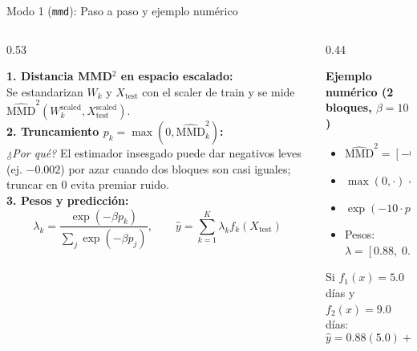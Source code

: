 \documentclass[aspectratio=169,11pt,table]{beamer}
\begin{document}
\begin{frame}{Modo 1 (\texttt{mmd}): Paso a paso y ejemplo numérico}
\setlength{\abovedisplayskip}{2pt}
\setlength{\belowdisplayskip}{2pt}
\begin{columns}[T,onlytextwidth]
\begin{column}{0.53\textwidth}
\begin{ccdebox}[top=1mm,bottom=1mm]
\scriptsize
\textbf{1. Distancia MMD$^2$ en espacio escalado:}\\
Se estandarizan $W_k$ y $X_{\text{test}}$ con el scaler de train y se mide $\widehat{\text{MMD}}^2(W_k^{\text{scaled}}, X_{\text{test}}^{\text{scaled}})$.\\[0.08cm]
\textbf{2. Truncamiento $p_k = \max(0, \widehat{\text{MMD}}^2_k)$:}\\
\textit{¿Por qué?} El estimador insesgado puede dar negativos leves (ej. $-0.002$) por azar cuando dos bloques son casi iguales; truncar en $0$ evita premiar ruido.\\[0.08cm]
\textbf{3. Pesos y predicción:}\\
\[\lambda_k = \frac{\exp(-\beta p_k)}{\sum_j \exp(-\beta p_j)}, \qquad \hat{y} = \sum_{k=1}^K \lambda_k f_k(X_{\text{test}})\]
\end{ccdebox}
\end{column}

\begin{column}{0.44\textwidth}
\begin{keybox}[top=1mm,bottom=1mm]
\scriptsize
\textbf{Ejemplo numérico (2 bloques, $\beta = 10$)}\\[0.06cm]
\begin{itemize}
  \item $\widehat{\text{MMD}}^2 = [-0.002,\; 0.20]$
  \item $\max(0, \cdot) \implies p = [0.00,\; 0.20]$
  \item $\exp(-10 \cdot p) = [1.000,\; 0.135]$
  \item Pesos: $\lambda = [0.88,\; 0.12]$
\end{itemize}
\vspace{0.06cm}
Si $f_1(x) = 5.0$ días y $f_2(x) = 9.0$ días:
\[\hat{y} = 0.88(5.0) + 0.12(9.0) = \mathbf{5.48\text{ días}}\]
\end{keybox}
\end{column}
\end{columns}
\end{frame}
\end{document}
